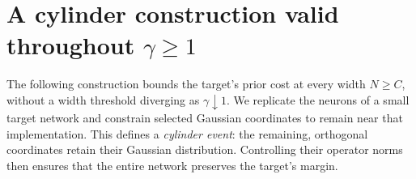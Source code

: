 \section{A cylinder construction valid throughout \texorpdfstring{$\gamma\geq1$}{gamma >= 1}}
\label{sec:cloning}
The following construction bounds the target's prior cost at every width $N\geq C$,
without a width threshold diverging as $\gamma\downarrow1$.
We replicate the neurons of a small target network and constrain selected
Gaussian coordinates to remain near that implementation. This defines a
\emph{cylinder event}: the remaining, orthogonal coordinates retain their
Gaussian distribution. Controlling their operator norms then ensures that
the entire network preserves the target's margin.

